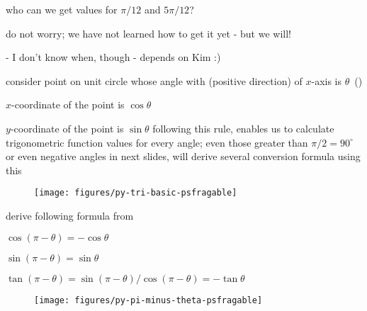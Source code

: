 \documentclass[17pt,landscape]{foils}
\begin{document}
\vitem
who can we get values for $\pi/12$ and $5\pi/12$?
\bit
\item
do not worry; we have not learned how to get it yet - but we will!
\bit
\item [-] I don't know when, though - depends on Kim :)
\eit
\eit
\eit
\vfill
{}
\bit
\item
consider point on unit circle whose angle with (positive direction) of $x$-axis is $\theta$\
()
\bit
\item
$x$-coordinate of the point is $\cos \theta$
\item
$y$-coordinate of the point is $\sin \theta$
\eit
\vitem
following this rule,
enables us to calculate trigonometric function values for every angle;
even those greater than $\pi/2=90^\circ$ or even negative angles
\vitem
in next slides, will derive several conversion formula using this
\eit
\begin{figure}
\begin{center}
\texttt{[image: figures/py-tri-basic-psfragable]}
\label{fig:trigonometric function values as Cartesian coordinates of points on unit circle}
\end{center}
\end{figure}
\bit
\item
derive following formula from 
\bit
\item
$\cos(\pi-\theta) = - \cos\theta$
\item
$\sin(\pi-\theta) = \sin\theta$
\item
$\tan(\pi-\theta) = \sin(\pi-\theta)/\cos(\pi-\theta) = -\tan \theta$
\eit
\eit
\begin{figure}
\begin{center}
\texttt{[image: figures/py-pi-minus-theta-psfragable]}
\label{fig:trigonometric function conversion formula for pi minus thera}
\end{center}
\end{figure}
\end{document}
